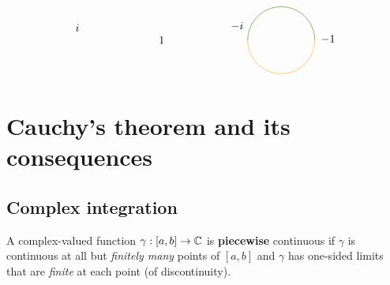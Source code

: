 \documentclass[12pt]{article}
\begin{document}
\[\begin{tikzpicture}[x=0.75pt,y=0.75pt,yscale=-1,xscale=1]
    \draw  [draw opacity=0] (280.28,130) .. controls (280.28,107.62) and (298.42,89.48) .. (320.8,89.48) .. controls (343.18,89.48) and (361.32,107.62) .. (361.32,130) -- (320.8,130) -- cycle ; \draw [color={rgb, 255:red, 65; green, 117; blue, 5 }  ,draw opacity=1 ]   (280.28,130) .. controls (280.28,107.62) and (298.42,89.48) .. (320.8,89.48) .. controls (343.18,89.48) and (361.32,107.62) .. (361.32,130) ;  
    \draw  [draw opacity=0] (361.32,130) .. controls (361.32,130) and (361.32,130) .. (361.32,130) .. controls (361.32,130) and (361.32,130) .. (361.32,130) .. controls (361.32,152.38) and (343.18,170.52) .. (320.8,170.52) .. controls (298.42,170.52) and (280.28,152.38) .. (280.28,130) -- (320.8,130) -- cycle ; \draw [color={rgb, 255:red, 245; green, 166; blue, 35 }  ,draw opacity=1 ]   (361.32,130) .. controls (361.32,130) and (361.32,130) .. (361.32,130) .. controls (361.32,152.38) and (343.18,170.52) .. (320.8,170.52) .. controls (298.42,170.52) and (280.28,152.38) .. (280.28,130) ;  
    
    \draw (171.6,124.6) node [anchor=north west][inner sep=0.75pt]    {$1$};
    \draw (70.8,109.2) node [anchor=north west][inner sep=0.75pt]    {$i$};
    \draw (367.6,122.8) node [anchor=north west][inner sep=0.75pt]    {$-1$};
    \draw (258.8,106.8) node [anchor=north west][inner sep=0.75pt]    {$-i$};
    
    
    \end{tikzpicture}
    \]

\section{Cauchy's theorem and its consequences}

\subsection{Complex integration}
 A complex-valued function $\gamma:[a,b]\to \mathbb{C}$ is \textbf{piecewise} continuous if $\gamma$ is continuous at all but \textit{finitely many} points of $[a,b]$ and $\gamma$ has one-sided limits that are \textit{finite} at each point (of discontinuity).
\end{document}
